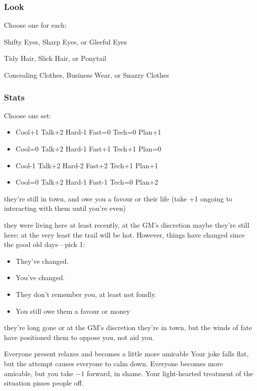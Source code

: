 \subsubsection{Look}
Choose one for each:

Shifty Eyes, Sharp Eyes, or Gleeful Eyes

Tidy Hair, Slick Hair, or Ponytail

Concealing Clothes, Business Wear, or Snazzy Clothes

\subsubsection{Stats}
Choose one set:
\begin{itemize}
\setlength\itemsep{0em}
\item Cool+1 Talk+2 Hard-1 Fast=0 Tech=0 Plan+1
\item Cool=0 Talk+2 Hard-1 Fast+1 Tech+1 Plan=0
\item Cool-1 Talk+2 Hard-2 Fast+2 Tech+1 Plan+1
\item Cool=0 Talk+2 Hard-1 Fast-1 Tech=0 Plan+2
\end{itemize}

{they're still in town, and owe you a favour or their life (take +1 ongoing to interacting with them until you're even)}
{they were living here at least recently, at the GM's discretion maybe they're still here; at the very least the trail will be hot. However, things have changed since the good old days---pick 1:
\begin{itemize}
\item They've changed.
\item You've changed.
\item They don't remember you, at least not fondly.
\item You still owe them a favour or money
\end{itemize}}
{they're long gone or at the GM's discretion they're in town, but the winds of fate have positioned them to oppose you, not aid you.}

{Everyone present relaxes and becomes a little more amicable}
{Your joke falls flat, but the attempt causes everyone to calm down. Everyone becomes more amicable, but you take $-1$ forward, in shame.}
{Your light-hearted treatment of the situation pisses people off.}

